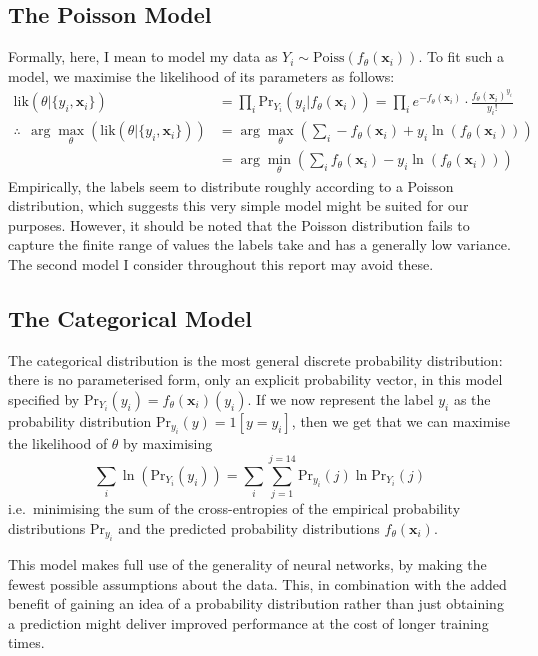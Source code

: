 \documentclass[10pt, twoside, a4paper]{article}
\begin{document}
	\subsection{The Poisson Model}
	Formally, here, I mean to model my data as $Y_i \sim \mathrm{Poiss}(f_\theta(\mathbf{x}_i))$.
	To fit such a model, we maximise the likelihood of its parameters as follows:
	\begin{align*}
		\mathrm{lik}(\theta | \{y_i, \mathbf x_i\}) &= \prod_i \mathrm{Pr}_{Y_i}(y_i | f_\theta(\mathbf x_i)) = \prod_i e^{-f_\theta(\mathbf x_i)} \cdot \frac{f_\theta(\mathbf x_i)^{y_i}}{y_i!} \\
		\therefore\ \ \arg\max_\theta(\mathrm{lik}(\theta|\{y_i, \mathbf x_i\}))
		&= \arg\max_\theta\left(\sum_i-f_\theta(\mathbf x_i) + y_i\ln(f_\theta(\mathbf{x}_i))\right) \\
		&= \arg\min_\theta\left(\sum_i f_\theta(\mathbf x_i) - y_i\ln(f_\theta(\mathbf x_i))\right)
	\end{align*}
	Empirically, the labels seem to distribute roughly according to a Poisson 
	distribution, which suggests this very simple model might be suited for 
	our purposes. However, it should be noted that the Poisson distribution fails to capture 
	the finite range of values the labels take and has a generally low variance.
	The second model I consider throughout this report may avoid these.

	\subsection{The Categorical Model}
	The categorical distribution is the most general discrete probability distribution: there 
	is no parameterised form, only an explicit probability vector, in this model specified by 
	$\mathrm{Pr}_{Y_i}(y_i) = f_\theta(\mathbf x_i)(y_i)$. If we now represent the label $y_i$
	as the probability distribution $\mathrm{Pr}_{y_i}(y) = 1[y = y_i]$, then we get that we can 
	maximise the likelihood of $\theta$ by maximising 
	$$
		\sum_i \ln\left(\mathrm{Pr}_{Y_i}(y_i)\right) = \sum_i \sum_{j = 1}^{j=14}
		\mathrm{Pr}_{y_i}(j) \ln\mathrm{Pr}_{Y_i}(j)
	$$
	i.e.\ minimising the sum of the cross-entropies of the empirical probability distributions 
	$\mathrm{Pr}_{y_i}$ and the predicted probability distributions $f_\theta(\mathbf x_i)$.

	This model makes full use of the generality of neural networks, by making the fewest 
	possible assumptions about the data. This, in combination with the added benefit of 
	gaining an idea of a probability distribution rather than just obtaining a prediction 
	might deliver improved performance at the cost of longer training times.
\end{document}
